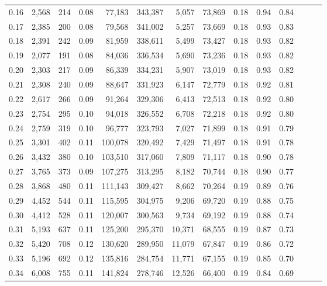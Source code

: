 \begin{tabular}{rrrrrrrrrrrrrr}
0.16 &  2,568 &    214 &  0.08 &   77,183 &  343,387 &   5,057 &  73,869 &  0.18 &  0.94 &      0.84 \\
0.17 &  2,385 &    200 &  0.08 &   79,568 &  341,002 &   5,257 &  73,669 &  0.18 &  0.93 &      0.83 \\
0.18 &  2,391 &    242 &  0.09 &   81,959 &  338,611 &   5,499 &  73,427 &  0.18 &  0.93 &      0.82 \\
0.19 &  2,077 &    191 &  0.08 &   84,036 &  336,534 &   5,690 &  73,236 &  0.18 &  0.93 &      0.82 \\
0.20 &  2,303 &    217 &  0.09 &   86,339 &  334,231 &   5,907 &  73,019 &  0.18 &  0.93 &      0.82 \\
0.21 &  2,308 &    240 &  0.09 &   88,647 &  331,923 &   6,147 &  72,779 &  0.18 &  0.92 &      0.81 \\
0.22 &  2,617 &    266 &  0.09 &   91,264 &  329,306 &   6,413 &  72,513 &  0.18 &  0.92 &      0.80 \\
0.23 &  2,754 &    295 &  0.10 &   94,018 &  326,552 &   6,708 &  72,218 &  0.18 &  0.92 &      0.80 \\
0.24 &  2,759 &    319 &  0.10 &   96,777 &  323,793 &   7,027 &  71,899 &  0.18 &  0.91 &      0.79 \\
0.25 &  3,301 &    402 &  0.11 &  100,078 &  320,492 &   7,429 &  71,497 &  0.18 &  0.91 &      0.78 \\
0.26 &  3,432 &    380 &  0.10 &  103,510 &  317,060 &   7,809 &  71,117 &  0.18 &  0.90 &      0.78 \\
0.27 &  3,765 &    373 &  0.09 &  107,275 &  313,295 &   8,182 &  70,744 &  0.18 &  0.90 &      0.77 \\
0.28 &  3,868 &    480 &  0.11 &  111,143 &  309,427 &   8,662 &  70,264 &  0.19 &  0.89 &      0.76 \\
0.29 &  4,452 &    544 &  0.11 &  115,595 &  304,975 &   9,206 &  69,720 &  0.19 &  0.88 &      0.75 \\
0.30 &  4,412 &    528 &  0.11 &  120,007 &  300,563 &   9,734 &  69,192 &  0.19 &  0.88 &      0.74 \\
0.31 &  5,193 &    637 &  0.11 &  125,200 &  295,370 &  10,371 &  68,555 &  0.19 &  0.87 &      0.73 \\
0.32 &  5,420 &    708 &  0.12 &  130,620 &  289,950 &  11,079 &  67,847 &  0.19 &  0.86 &      0.72 \\
0.33 &  5,196 &    692 &  0.12 &  135,816 &  284,754 &  11,771 &  67,155 &  0.19 &  0.85 &      0.70 \\
0.34 &  6,008 &    755 &  0.11 &  141,824 &  278,746 &  12,526 &  66,400 &  0.19 &  0.84 &      0.69 \\

\end{tabular}
